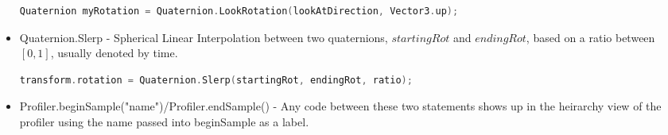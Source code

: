 \documentclass{article}
\begin{document}
\begin{itemize}
    \begin{lstlisting}[language=C++]
                Quaternion myRotation = Quaternion.LookRotation(lookAtDirection, Vector3.up); \end{lstlisting}
    \item Quaternion.Slerp - Spherical Linear Interpolation between two quaternions, $startingRot$ and $endingRot$, based on a ratio between $[0,1]$, usually denoted by time.
    \begin{lstlisting}[language=C++]
                transform.rotation = Quaternion.Slerp(startingRot, endingRot, ratio); \end{lstlisting}
    \item Profiler.beginSample("name")/Profiler.endSample() - Any code between these two statements shows up in the heirarchy view of the profiler using the name passed into beginSample as a label. 
\end{itemize}
\end{document}
